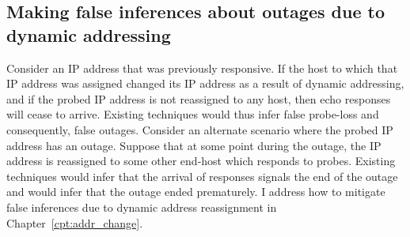
\subsection{Making false inferences about outages due to dynamic
      addressing}

 Consider an IP address that was previously responsive. If the host
to which that IP address was assigned changed its IP address as a
result of dynamic addressing, and if the probed IP address is not
reassigned to any host, then echo responses will cease to
arrive. Existing techniques would thus infer false probe-loss and
consequently, false outages. Consider an alternate scenario where the
probed IP address has an outage. Suppose that at some point during the
outage, the IP address is reassigned to some other end-host which
responds to probes. Existing techniques would infer that the arrival
of responses signals the end of the outage and would infer that the
outage ended prematurely.  I address how to mitigate false inferences
due to dynamic address reassignment in Chapter~\ref{cpt:addr_change}.





